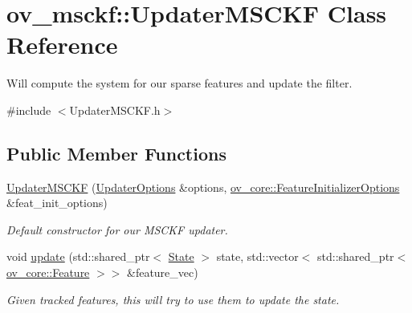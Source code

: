 \hypertarget{classov__msckf_1_1UpdaterMSCKF}{}\section{ov\+\_\+msckf\+:\+:Updater\+M\+S\+C\+KF Class Reference}
\label{classov__msckf_1_1UpdaterMSCKF}


Will compute the system for our sparse features and update the filter.  




{\ttfamily \#include $<$Updater\+M\+S\+C\+K\+F.\+h$>$}

\subsection*{Public Member Functions}
\begin{DoxyCompactItemize}
\item 
\hyperlink{classov__msckf_1_1UpdaterMSCKF_af8d2ffc21b0209319c7fd9a351b9d3ad}{Updater\+M\+S\+C\+KF} (\hyperlink{structov__msckf_1_1UpdaterOptions}{Updater\+Options} \&options, \hyperlink{structov__core_1_1FeatureInitializerOptions}{ov\+\_\+core\+::\+Feature\+Initializer\+Options} \&feat\+\_\+init\+\_\+options)
\begin{DoxyCompactList}\small\item\em Default constructor for our M\+S\+C\+KF updater. \end{DoxyCompactList}\item 
void \hyperlink{classov__msckf_1_1UpdaterMSCKF_a4f307c56582c5fefeef298c5b54da2fd}{update} (std\+::shared\+\_\+ptr$<$ \hyperlink{classov__msckf_1_1State}{State} $>$ state, std\+::vector$<$ std\+::shared\+\_\+ptr$<$ \hyperlink{classov__core_1_1Feature}{ov\+\_\+core\+::\+Feature} $>$$>$ \&feature\+\_\+vec)
\begin{DoxyCompactList}\small\item\em Given tracked features, this will try to use them to update the state. \end{DoxyCompactList}\end{DoxyCompactItemize}
